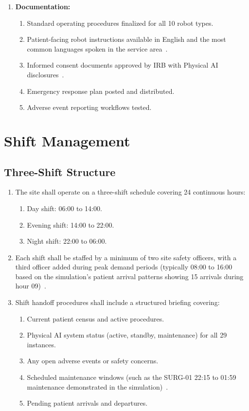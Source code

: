 \documentclass[11pt,letterpaper]{article}
\begin{document}
\begin{enumerate}[label=(\alph*)]
\item \textbf{Documentation:}
  \begin{enumerate}[label=(\arabic*)]
  \item Standard operating procedures finalized for all 10 robot types.
  \item Patient-facing robot instructions available in English and
    the most common languages spoken in the service
    area~\cite{patientinstructions2026}.
  \item Informed consent documents approved by IRB with Physical AI
    disclosures~\cite{cfr50adapt}.
  \item Emergency response plan posted and distributed.
  \item Adverse event reporting workflows tested.
  \end{enumerate}
\end{enumerate}

\section{Shift Management}

\subsection{Three-Shift Structure}

\begin{enumerate}[label=(\alph*)]
\item The site shall operate on a three-shift schedule covering 24 continuous
  hours:
  \begin{enumerate}[label=(\arabic*)]
  \item Day shift: 06:00 to 14:00.
  \item Evening shift: 14:00 to 22:00.
  \item Night shift: 22:00 to 06:00.
  \end{enumerate}

\item Each shift shall be staffed by a minimum of two site safety officers, with
  a third officer added during peak demand periods (typically 08:00 to 16:00
  based on the simulation's patient arrival patterns showing 15 arrivals
  during hour 09)~\cite{newtrial2026}.

\item Shift handoff procedures shall include a structured briefing covering:
  \begin{enumerate}[label=(\arabic*)]
  \item Current patient census and active procedures.
  \item Physical AI system status (active, standby, maintenance) for all 29
    instances.
  \item Any open adverse events or safety concerns.
  \item Scheduled maintenance windows (such as the SURG-01 22:15 to 01:59
    maintenance demonstrated in the simulation)~\cite{newtrial2026}.
  \item Pending patient arrivals and departures.
  \end{enumerate}
\end{enumerate}
\end{document}

